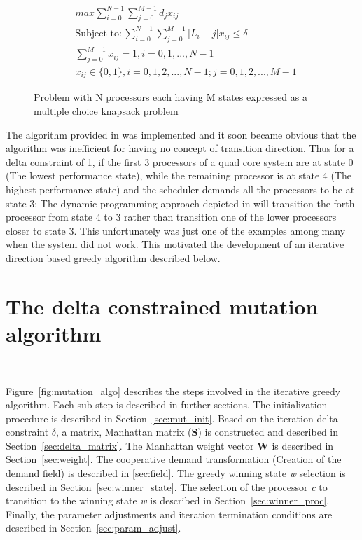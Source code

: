 \begin{figure}[h!]
\centering
\begin{align*}
    & max \displaystyle\sum_{i=0}^{N-1} \displaystyle\sum_{j=0}^{M-1} d_jx_{ij} \\
    & \text{Subject to} : \displaystyle\sum_{i=0}^{N-1} \displaystyle\sum_{j=0}^{M-1} |L_i - j| x_{ij} \leq \delta \\
    & \displaystyle\sum_{j=0}^{M-1} x_{ij} = 1 , i = 0, 1, ..., N-1 \\
    & x_{ij} \in \{0,1\} , i = 0,1,2,...,N-1 ; j = 0,1,2,...,M-1  
\end{align*}
\caption{Problem with N processors each having M states expressed as a multiple choice knapsack problem}
\label{fig:mckp}
\end{figure}

The algorithm provided in \cite{mckp} was implemented and it soon became obvious 
that the algorithm was inefficient for having no concept of transition direction. Thus for 
a delta constraint of 1, if 
the first 3 processors of a quad core system are at state 0 (The lowest performance state),
while the remaining processor is at state 4 (The highest performance state) and the scheduler
demands all the processors to be at state 3: The dynamic programming approach depicted in
\cite{mckp} will transition the forth processor from state 4 to 3 rather than transition 
one of the lower processors closer to state 3. This unfortunately was just one of the examples
among many when the system did not work. This motivated the development of an iterative 
direction based greedy algorithm described below.


\section{The delta constrained mutation algorithm}~\label{sec:delta_algo}

Figure~\ref{fig:mutation_algo} describes the steps involved in the iterative greedy algorithm. 
Each sub step is described in further sections. The initialization procedure is described in Section~\ref{sec:mut_init}.
Based on the iteration delta constraint $\delta$, a matrix, Manhattan
matrix (\textbf{S}) is constructed and described in Section~\ref{sec:delta_matrix}.
The Manhattan weight vector \textbf{W} is described in Section~\ref{sec:weight}.
The cooperative demand transformation (Creation of the demand field) is described in
\ref{sec:field}. The greedy winning state \textit{w} selection is described in Section~\ref{sec:winner_state}.
The selection of the processor \textit{c} to transition to the winning state \textit{w} 
is described in Section~\ref{sec:winner_proc}. Finally, the parameter adjustments and iteration
termination conditions are described in Section~\ref{sec:param_adjust}. 

